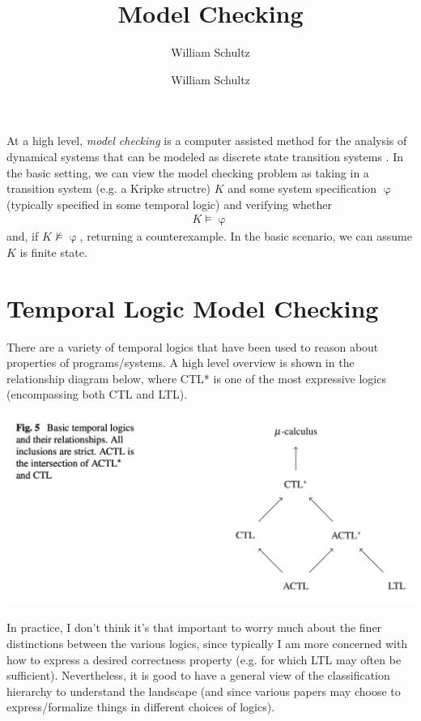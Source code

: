 \documentclass[10pt,a4paper]{article}
\author{William Schultz}
\begin{document}
\title{Model Checking}
\author{William Schultz}
\maketitle

At a high level, \textit{model checking} is a computer assisted method for the analysis of dynamical systems that can be modeled as discrete state transition systems \cite{Clarke2018ch1}. In the basic setting, we can view the model checking problem as taking in a transition system (e.g. a Kripke structre) $K$ and some system specification $\upvarphi$ (typically specified in some temporal logic)  and verifying whether 
\begin{align*}
    K \vDash \upvarphi
\end{align*}
and, if $K \nvDash \upvarphi$, returning a counterexample. In the basic scenario, we can assume $K$ is finite state.

\section{Temporal Logic Model Checking}

There are a variety of temporal logics that have been used to reason about properties of programs/systems. A high level overview is shown in the relationship diagram below, where CTL* is one of the most expressive logics (encompassing both CTL and LTL).
\begin{center}
    \includegraphics[scale=0.3]{images/temp-logics.png}
\end{center}
In practice, I don't think it's that important to worry much about the finer distinctions between the various logics, since typically I am more concerned with how to express a desired correctness property (e.g. for which LTL may often be sufficient). Nevertheless, it is good to have a general view of the classification hierarchy to understand the landscape (and since various papers may choose to express/formalize things in different choices of logics).
\end{document}
